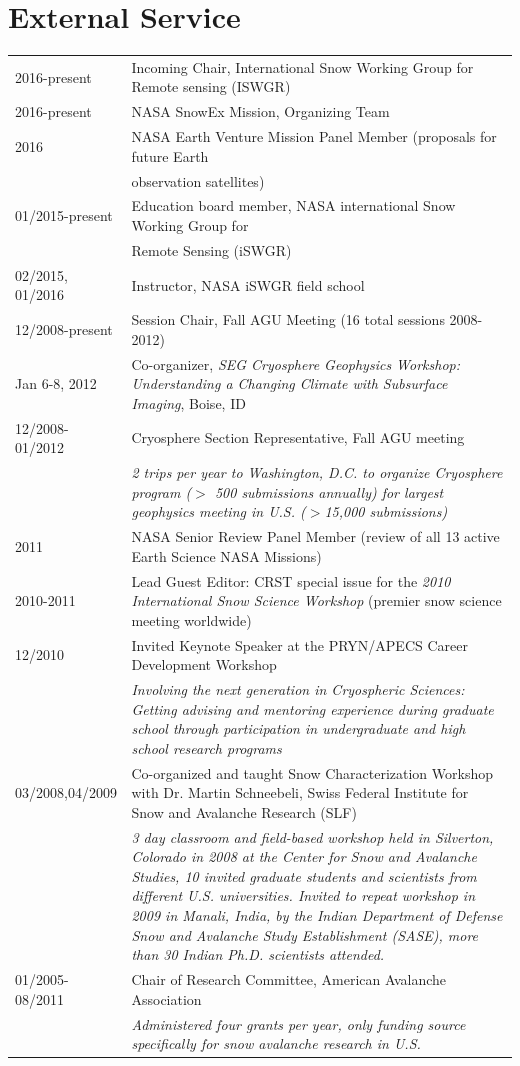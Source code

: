 \documentclass[11pt]{article}
\renewcommand\arraystretch{1}
\begin{document}
\section*{External Service}
\begingroup
\renewcommand\arraystretch{0.7}
\begin{longtable}{p{1.2in}|p{5.7in}}
2016-present & Incoming Chair, International Snow Working Group for Remote sensing (ISWGR) \\
2016-present & NASA SnowEx Mission, Organizing Team \\
2016 & NASA Earth Venture Mission Panel Member (proposals for future Earth \\ 
& observation satellites) \\
01/2015-present & Education board member, NASA international Snow Working Group for \\ 
& Remote Sensing (iSWGR) \\
02/2015, 01/2016 & Instructor, NASA iSWGR field school \\
12/2008-present & Session Chair, Fall AGU Meeting (16 total sessions 2008-2012) \\
Jan 6-8, 2012 & Co-organizer, \textit{SEG Cryosphere Geophysics Workshop: Understanding a Changing Climate with Subsurface Imaging}, Boise, ID \\
12/2008-01/2012 & Cryosphere Section Representative, Fall AGU meeting \\
&\textit{2 trips per year to Washington, D.C. to organize Cryosphere program ($>$ 500 
submissions annually) for largest geophysics meeting in U.S. ($>$15,000 submissions)} \\
2011 & NASA Senior Review Panel Member (review of all 13 active Earth Science NASA Missions)  \\
2010-2011 & Lead Guest Editor: CRST special issue for the \textit{2010 International Snow
Science Workshop} (premier snow science meeting worldwide) \\
12/2010 & Invited Keynote Speaker at the PRYN/APECS Career Development Workshop \\
& \textit{Involving the next generation in Cryospheric Sciences: Getting advising and mentoring experience during graduate school through participation in undergraduate and high school research programs} \\


03/2008,04/2009 & Co-organized and taught Snow Characterization Workshop with Dr. Martin Schneebeli, Swiss Federal Institute for Snow and Avalanche Research (SLF) \\
& \textit{3 day classroom and field-based workshop held in Silverton, Colorado in 2008 at the Center for Snow and Avalanche Studies, 10 invited graduate students and scientists from different U.S. universities.  Invited to repeat workshop in 2009 in Manali, India, by the Indian Department of Defense Snow and Avalanche Study Establishment (SASE), more than 30 Indian Ph.D. scientists attended.} \\
01/2005-08/2011 & Chair of Research Committee, American Avalanche Association \\
& \textit{Administered four grants per year, only funding source specifically for snow avalanche research in U.S.} \\


\end{longtable}
\end{document}
